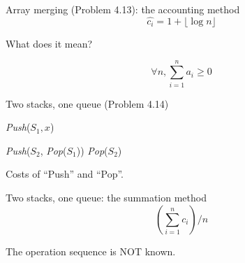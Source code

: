 \begin{frame}{Array merging (Problem 4.13): the accounting method}
  \[
	\hat{c_i} = 1 + \lfloor \log n \rfloor
  \]

  \pause
  \vspace{0.60cm}
  \centerline{What does it mean?}

  \pause
  \vspace{0.80cm}
  \[
	\forall n, \sum_{i=1}^{n} a_i \geq 0
  \]
\end{frame}
\begin{frame}{Two stacks, one queue (Problem 4.14)}
  \begin{algorithm}[H]
    \caption{Simulating a queue using two stacks $S_1, S_2$.}
    \begin{algorithmic}[]
		\State \textsl{Push}($S_1, x$)
      \EndProcedure

	  \Statex

            \State \textsl{Push}($S_2$, \textsl{Pop}($S_1$))
          \EndWhile
        \EndIf
        \textsl{Pop}($S_2$)
      \EndProcedure
    \end{algorithmic}
  \end{algorithm}

  \pause
  \centerline{Costs of ``Push'' and ``Pop''.}
\end{frame}
\begin{frame}{Two stacks, one queue: the summation method}
  \[
	(\sum_{i = 1}^{n} c_i) / n
  \]

  \pause
  \centerline{The operation sequence is NOT known.}
\end{frame}
